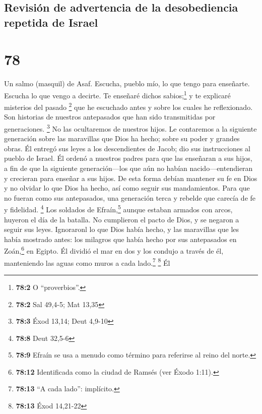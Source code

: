 \hypertarget{revisiuxf3n-de-advertencia-de-la-desobediencia-repetida-de-israel}{%
\subsection{Revisión de advertencia de la desobediencia repetida de
Israel}\label{revisiuxf3n-de-advertencia-de-la-desobediencia-repetida-de-israel}}

\hypertarget{section-77}{%
\section{78}\label{section-77}}

Un salmo (masquil) de Asaf.  Escucha, pueblo mío, lo que
tengo para enseñarte. Escucha lo que vengo a decirte.  Te
enseñaré dichos sabios;\footnote{\textbf{78:2} O ``proverbios''.} y te
explicaré misterios del pasado \footnote{\textbf{78:2} Sal 49,4-5; Mat
  13,35}  que he escuchado antes y sobre los cuales he
reflexionado. Son historias de nuestros antepasados que han sido
transmitidas por generaciones. \footnote{\textbf{78:3} Éxod 13,14; Deut
  4,9-10}  No las ocultaremos de nuestros hijos. Le
contaremos a la siguiente generación sobre las maravillas que Dios ha
hecho; sobre su poder y grandes obras.  Él entregó sus
leyes a los descendientes de Jacob; dio sus instrucciones al pueblo de
Israel. Él ordenó a nuestros padres para que las enseñaran a sus hijos,
 a fin de que la siguiente generación---los que aún no
habían nacido---entendieran y crecieran para enseñar a sus hijos.
 De esta forma debían mantener su fe en Dios y no olvidar
lo que Dios ha hecho, así como seguir sus mandamientos. 
Para que no fueran como sus antepasados, una generación terca y rebelde
que carecía de fe y fidelidad. \footnote{\textbf{78:8} Deut 32,5-6}
 Los soldados de Efraín,\footnote{\textbf{78:9} Efraín se
  usa a menudo como término para referirse al reino del norte.} aunque
estaban armados con arcos, huyeron el día de la batalla. 
No cumplieron el pacto de Dios, y se negaron a seguir sus leyes.
 Ignoraronl lo que Dios había hecho, y las maravillas que
les había mostrado antes:  los milagros que había hecho
por sus antepasados en Zoán,\footnote{\textbf{78:12} Identificada como
  la ciudad de Ramsés (ver Éxodo 1:11).} en Egipto.  Él
dividió el mar en dos y los condujo a través de él, manteniendo las
aguas como muros a cada lado.\footnote{\textbf{78:13} ``A cada lado'':
  implícito.} \footnote{\textbf{78:13} Éxod 14,21-22}  Él
